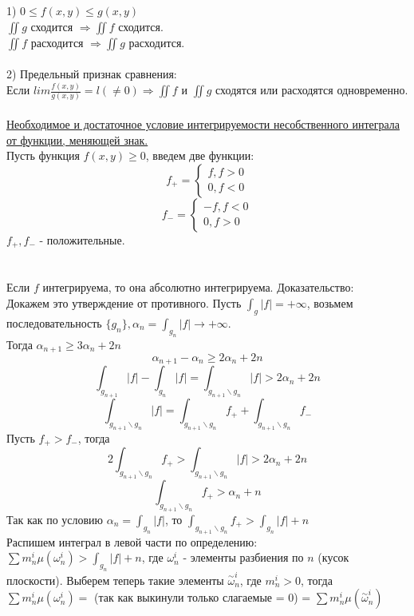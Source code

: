 \documentclass[12pt]{article}
\begin{document}
1) $0\leq f(x,y) \leq g(x,y)$\\
$\iint g$ сходится $\Rightarrow \iint f$ сходится.\\
$\iint f$ расходится $\Rightarrow \iint g$ расходится.\\
\\
2) Предельный признак сравнения:\\
Если $lim \frac{f(x,y)}{g(x,y)} = l(\neq 0) \Rightarrow \iint f$ и $\iint g$ сходятся или расходятся одновременно.\\
\\
\label{question24_4}\uline{Необходимое и достаточное условие интегрируемости несобственного интеграла от функции, меняющей знак.}\\
Пусть функция $f(x,y) \geq 0$, введем две функции:\\
$$f_{+} = \begin{cases}f, f>0 \\ 0, f<0 \end{cases}$$
$$f_{-} = \begin{cases}-f, f<0 \\ 0, f>0 \end{cases}$$
$f_{+}, f_{-}$ - положительные.\\
\\
\\
Если $f$ интегрируема, то она абсолютно интегрируема. Доказательство:\\
Докажем это утверждение от противного. Пусть $\int_g |f| = +\infty$, возьмем последовательность $\{g_n\}, \alpha_n = \int_{g_n} |f| \to +\infty$.\\
Тогда $\alpha_{n+1} \geq 3\alpha_n + 2n$\\
$$\alpha_{n+1} - \alpha_n \geq 2\alpha_n + 2n$$
$$\int_{g_{n+1}} |f| - \int_{g_n} |f| = \int_{g_{n+1} \backslash g_n} |f| > 2\alpha_n + 2n$$
$$\int_{g_{n+1} \backslash g_n} |f| = \int_{g_{n+1} \backslash g_n} f_{+} + \int_{g_{n+1} \backslash g_n} f_{-}$$
Пусть $f_{+} > f_{-}$, тогда\\
$$2 \int_{g_{n+1} \backslash g_n} f_{+} > \int_{g_{n+1} \backslash g_n} |f| > 2\alpha_n + 2n$$
$$\int_{g_{n+1} \backslash g_n} f_{+} > \alpha_n + n$$
Так как по условию $\alpha_n = \int_{g_n} |f|$, то $\int_{g_{n+1} \backslash g_n} f_{+} > \int_{g_n} |f| + n$\\
Распишем интеграл в левой части по определению:\\
$\sum m_n^i \mu (\omega_n^i) > \int_{g_n} |f| + n$, где $\omega_n^i$ - элементы разбиения по $n$ (кусок плоскости). Выберем теперь такие элементы $\overset{\sim}{\omega}_n^i$, где $m_n^i > 0$, тогда \\$\sum m_n^i \mu (\omega_n^i) =$ (так как выкинули только слагаемые = 0) = $\sum m_n^i \mu (\overset{\sim}{\omega}_n^i)$\\
\end{document}
